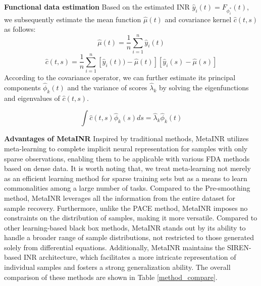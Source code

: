 \documentclass{article}
\begin{document}
\textbf{Functional data estimation}
Based on the estimated INR $\hat{y}_i(t)=F_{\phi^*_i}(t)$, we subsequently estimate the mean function $\hat{\mu}(t)$ and covariance kernel $\hat{c}(t,s)$ as follows:
$$
\hat{\mu}(t)= \frac{1}{n} \sum_{i=1}^n \hat{y}_i(t)
$$
$$
\hat{c}(t,s)= \frac{1}{n} \sum_{i=1}^n  [\hat{y}_i(t))-\hat{\mu}(t)] [\hat{y}_i(s)-\hat{\mu}(s) ]
$$
According to the covariance operator, we can further estimate its principal components $\hat{\phi}_k(t)$ and the variance of scores $\hat \lambda_k$ by solving the eigenfunctions and eigenvalues of $\hat{c}(t,s)$.

$$
\int \hat{c}(t,s) \hat{\phi}_k(s) ds= \hat \lambda_k \hat{\phi}_k(t)
$$


\textbf{Advantages of MetaINR}
Inspired by traditional methods, MetaINR utilizes meta-learning to complete implicit neural representation for samples with only sparse observations, 
enabling them to be applicable with various FDA methods based on dense data.
It is worth noting that, we treat meta-learning not merely as an efficient learning method for sparse training sets but as a means to learn commonalities among a large number of tasks.
Compared to the Pre-smoothing method, MetaINR leverages all the information from the entire dataset for sample recovery. 
Furthermore, unlike the PACE method, 
MetaINR imposes no constraints on the distribution of samples, making it more versatile.
Compared to other learning-based black box methods, MetaINR stands out by its ability to handle a broader range of sample distributions, not restricted to those generated solely from differential equations.
Additionally, MetaINR maintains the SIREN-based INR architecture, which facilitates a more intricate representation of individual samples and fosters a strong generalization ability.
The overall comparison of these methods are shown in Table \ref{method_compare}.
\end{document}
